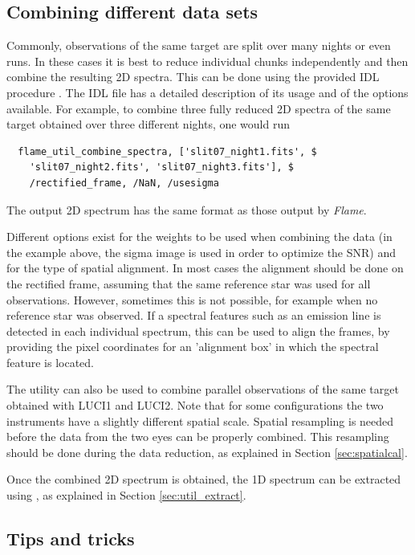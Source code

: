 \documentclass[a4paper]{article}
\newcommand{\flame}{\emph{Flame}}
\begin{document}
\begin{sloppypar}
\subsection{Combining different data sets}

Commonly, observations of the same target are split over many nights or even runs. In these cases it is best to reduce individual chunks independently and then combine the resulting 2D spectra. This can be done using the provided IDL procedure . The IDL file has a detailed description of its usage and of the options available. For example, to combine three fully reduced 2D spectra of the same target obtained over three different nights, one would run
\begin{lstlisting}
  flame_util_combine_spectra, ['slit07_night1.fits', $
    'slit07_night2.fits', 'slit07_night3.fits'], $
    /rectified_frame, /NaN, /usesigma
\end{lstlisting}
The output 2D spectrum has the same format as those output by \flame.

Different options exist for the weights to be used when combining the data (in the example above, the sigma image is used in order to optimize the SNR) and for the type of spatial alignment. In most cases the alignment should be done on the rectified frame, assuming that the same reference star was used for all observations. However, sometimes this is not possible, for example when no reference star was observed. If a spectral features such as an emission line is detected in each individual spectrum, this can be used to align the frames, by providing the pixel coordinates for an 'alignment box' in which the spectral feature is located.

The utility  can also be used to combine parallel observations of the same target obtained with LUCI1 and LUCI2. Note that for some configurations the two instruments have a slightly different spatial scale. Spatial resampling is needed before the data from the two eyes can be properly combined. This resampling should be done during the data reduction, as explained in Section \ref{sec:spatialcal}.

Once the combined 2D spectrum is obtained, the 1D spectrum can be extracted using , as explained in Section \ref{sec:util_extract}.


\subsection{Tips and tricks}
\label{sec:tips}


\end{sloppypar}
\end{document}
